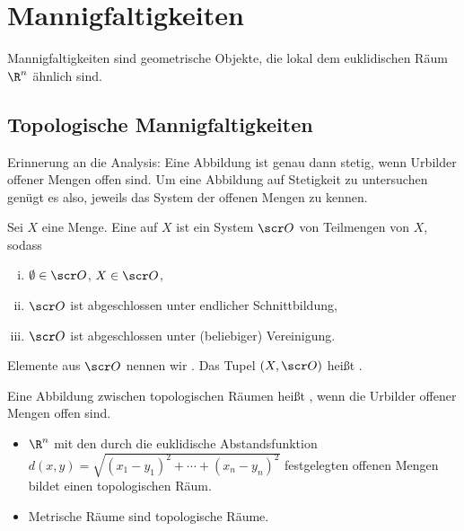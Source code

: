 \chapter{Mannigfaltigkeiten}

Mannigfaltigkeiten sind geometrische Objekte, die lokal dem euklidischen Räum $\R^n$ ähnlich sind.

\section{Topologische Mannigfaltigkeiten}

Erinnerung an die Analysis:
Eine Abbildung ist genau dann stetig, wenn Urbilder offener Mengen offen sind.
Um eine Abbildung auf Stetigkeit zu untersuchen genügt es also, jeweils das System der offenen Mengen zu kennen.

\begin{df} \label{1.1} %
    Sei $X$ eine Menge.
    Eine  auf $X$ ist ein System $\scr O$ von Teilmengen von $X$, sodass
    \begin{enumerate}[(i)]
        \item
            $\emptyset \in \scr O$, $X \in \scr O$,
        \item
            $\scr O$ ist abgeschlossen unter endlicher Schnittbildung,
        \item
            $\scr O$ ist abgeschlossen unter (beliebiger) Vereinigung.
    \end{enumerate}
    Elemente aus $\scr O$ nennen wir .
    Das Tupel $(X, \scr O)$ heißt .

    Eine Abbildung zwischen topologischen Räumen heißt , wenn die Urbilder offener Mengen offen sind.
\end{df}

\begin{ex*}
    \begin{itemize}
        \item
            $\R^n$ mit den durch die euklidische Abstandsfunktion
            \begin{math}
                d(x,y) = \sqrt{(x_1 - y_1)^2 + \dotsb + (x_n - y_n)^2}
            \end{math}
            festgelegten offenen Mengen bildet einen topologischen Räum.
        \item
            Metrische Räume sind topologische Räume.
    \end{itemize}
\end{ex*}


